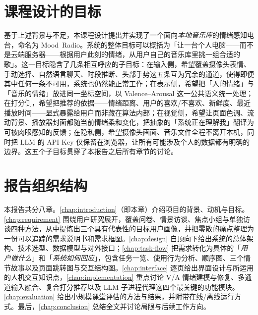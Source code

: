 \section{课程设计的目标}

基于上述背景与不足，本课程设计提出并实现了一个面向\emph{本地音乐库}的情绪感知电台，命名为 \mbox{Mood Radio}。系统的整体目标可以概括为「让一台个人电脑——而不是云端服务器——根据用户此刻的情绪，从用户自己的音乐库里挑一组合适的歌」。这一目标隐含了几条相互呼应的子目标：在输入侧，希望覆盖摄像头表情、手动选择、自然语言聊天、时段推断、头部手势这五条互为冗余的通道，使得即便其中任何一条不可用，系统也仍然能正常工作；在表示侧，希望把「人的情绪」与「音乐的情绪」放进同一坐标空间，以 Valence--Arousal 这一公共语义统一处理；在打分侧，希望把推荐的依据——情绪距离、用户的喜欢/不喜欢、新鲜度、最近播放时间——显式暴露给用户而非藏在算法内部；在视觉侧，希望让页面色调、流动背景、播放器封面都随当前情绪柔和变化，把抽象的「系统正在理解我」翻译为可被肉眼感知的反馈；在隐私侧，希望摄像头画面、音乐文件全程不离开本机，同时把 LLM 的 API Key 仅保留在浏览器，让所有可能涉及个人的数据都有明确的边界。这五个子目标贯穿了本报告之后所有章节的讨论。

\section{报告组织结构}

本报告共分八章。\cref{chap:introduction}（即本章）介绍项目的背景、动机与目标。\cref{chap:requirement} 围绕用户研究展开，覆盖问卷、情景访谈、焦点小组与单独访谈四种方法，从中提炼出三个具有代表性的目标用户画像，并把零散的痛点整理为一份可以追踪的需求说明书和需求框图。\cref{chap:design} 自顶向下给出系统的总体架构、技术选型、数据模型与对外接口；\cref{chap:task-flow} 把需求转化为具体的「\emph{用户做什么}」和「\emph{系统如何回应}」，包含任务一览、使用行为分析、顺序图、三个情节故事以及页面跳转图与交互结构图。\cref{chap:interface} 逐页给出界面设计与所运用的人机交互知识点，\cref{chap:implementation} 重点讨论 V/A 情绪建模与修复、多通道输入融合、复合打分推荐以及 LLM 子进程代理这四个最关键的功能模块。\cref{chap:evaluation} 给出小规模课堂评估的方法与结果，并附带在线/离线运行方式。最后，\cref{chap:conclusion} 总结全文并讨论局限与后续工作方向。
